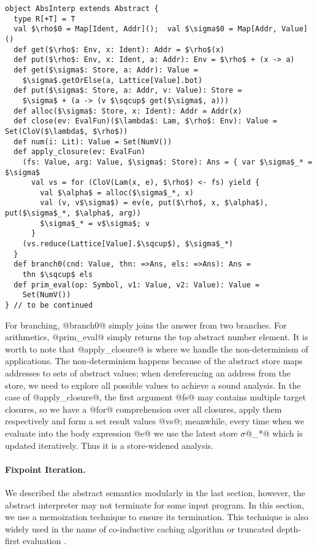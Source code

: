 \begin{lstlisting}
object AbsInterp extends Abstract {
  type R[+T] = T
  val $\rho$0 = Map[Ident, Addr]();  val $\sigma$0 = Map[Addr, Value]()
  def get($\rho$: Env, x: Ident): Addr = $\rho$(x)
  def put($\rho$: Env, x: Ident, a: Addr): Env = $\rho$ + (x -> a)
  def get($\sigma$: Store, a: Addr): Value = 
    $\sigma$.getOrElse(a, Lattice[Value].bot)
  def put($\sigma$: Store, a: Addr, v: Value): Store =
    $\sigma$ + (a -> (v $\sqcup$ get($\sigma$, a)))
  def alloc($\sigma$: Store, x: Ident): Addr = Addr(x)
  def close(ev: EvalFun)($\lambda$: Lam, $\rho$: Env): Value = Set(CloV($\lambda$, $\rho$))
  def num(i: Lit): Value = Set(NumV())
  def apply_closure(ev: EvalFun)
    (fs: Value, arg: Value, $\sigma$: Store): Ans = { var $\sigma$_* = $\sigma$
      val vs = for (CloV(Lam(x, e), $\rho$) <- fs) yield {
        val $\alpha$ = alloc($\sigma$_*, x)
        val (v, v$\sigma$) = ev(e, put($\rho$, x, $\alpha$), put($\sigma$_*, $\alpha$, arg))
        $\sigma$_* = v$\sigma$; v
      }
    (vs.reduce(Lattice[Value].$\sqcup$), $\sigma$_*)
  }
  def branch0(cnd: Value, thn: =>Ans, els: =>Ans): Ans = 
    thn $\sqcup$ els
  def prim_eval(op: Symbol, v1: Value, v2: Value): Value = 
    Set(NumV())
} // to be continued
\end{lstlisting}

For branching, @branch0@ simply joins the answer from two branches. For arithmetics, @prim_eval@ simply 
returns the top abstract number element.
It is worth to note that @apply_closure@ is where we handle the non-determinism of applications.
The non-determinism happens because of the abstract store maps addresses to sets of abstract values;
when dereferencing an address from the store, we need to explore all possible values to achieve a sound 
analysis. In the case of @apply_closure@, the first argument @fs@ may contains multiple target closures,
so we have a @for@ comprehension over all closures, apply them respectively and form a set result values @vs@;
meanwhile, every time when we evaluate into the body expression @e@ we use the latest store $\sigma$@_*@
which is updated iteratively. Thus it is a store-widened analysis.


\paragraph{Fixpoint Iteration.}
We described the abstract semantics modularly in the last section, however, the abstract 
interpreter may not terminate for some input program. In this section, we use a memoization
technique to ensure its termination. This technique is also widely used in the name of co-inductive caching algorithm
\cite{DBLP:journals/pacmpl/DaraisLNH17, Wei:2018:RAA:3243631.3236800} or truncated depth-first evaluation 
\cite{Rosendahl:AbsIntPL}.

